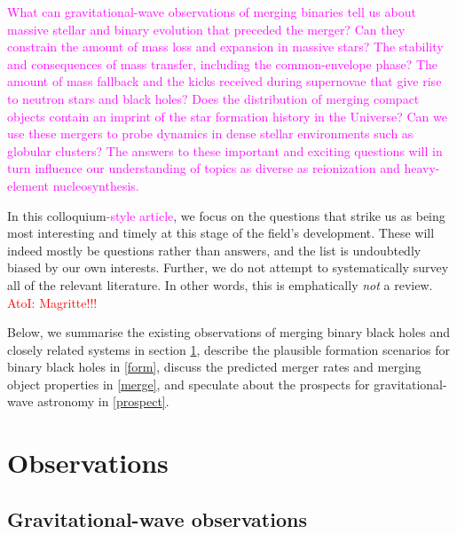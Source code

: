 \documentclass[iop,onecolumn]{revtex4}
\newcommand{\ajf}[1]{\textcolor{red}{AtoI: #1}}
\newcommand{\ilya}[1]{\textcolor{magenta}{#1}}
\begin{document}
\ilya{What can gravitational-wave observations of merging binaries tell us about massive stellar and binary evolution that preceded the merger?  Can they constrain the amount of mass loss and expansion in massive stars?  The stability and consequences of mass transfer, including the common-envelope phase?  The amount of mass fallback and the kicks received during supernovae that give rise to neutron stars and black holes?  Does the distribution of merging compact objects contain an imprint of the star formation history in the Universe?    Can we use these mergers to probe dynamics in dense stellar environments such as globular clusters?  The answers to these important and exciting questions will in turn influence our understanding of topics as diverse as reionization and heavy-element nucleosynthesis.}


In this colloquium\ilya{-style article}, we focus on the questions that strike us as being most interesting and timely at this stage of the field's development.  These will indeed mostly be questions rather than answers, and the list is undoubtedly biased by our own interests. Further, we do not attempt to systematically survey all of the relevant literature.  In other words, this is emphatically {\it not} a review. \ajf{Magritte!!!} %


Below, we summarise the existing observations of merging binary black holes and closely related systems in section \ref{obs}, describe the plausible formation scenarios for binary black holes in \autoref{form}, discuss the predicted merger rates and merging object properties in \autoref{merge}, and speculate about the prospects for gravitational-wave astronomy in \autoref{prospect}.


 

\section{Observations}\label{obs}

\subsection{Gravitational-wave observations}
\end{document}
